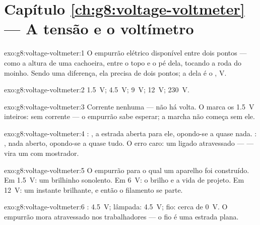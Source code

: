 \section*{Capítulo \ref{ch:g8:voltage-voltmeter} --- A tensão e o voltímetro}

\begin{solution}{exo:g8:voltage-voltmeter:1}
O empurrão elétrico disponível entre dois pontos --- como a altura de
uma cachoeira, entre o topo e o pé dela, tocando a roda do moinho.
Sendo uma diferença, ela precisa de dois pontos; a  dela é o
, \unit{V}.
\end{solution}

\begin{solution}{exo:g8:voltage-voltmeter:2}
\qty{1.5}{V}; \qty{4.5}{V}; \qty{9}{V}; \qty{12}{V}; \qty{230}{V}.
\end{solution}

\begin{solution}{exo:g8:voltage-voltmeter:3}
Corrente nenhuma --- não há volta. O  marca os \qty{1.5}{V}
inteiros:  sem corrente --- o empurrão sabe esperar; a marcha
não começa sem ele.
\end{solution}

\begin{solution}{exo:g8:voltage-voltmeter:4}
: , a estrada aberta para ele, opondo-se a quase
nada. : , nada aberto, opondo-se a quase tudo. O
erro caro: um  ligado atravessado ---  --- vira
um  com mostrador.
\end{solution}

\begin{solution}{exo:g8:voltage-voltmeter:5}
O empurrão para o qual um aparelho foi construído. Em \qty{1.5}{V}:
um brilhinho sonolento. Em \qty{6}{V}: o brilho e a vida de projeto.
Em \qty{12}{V}: um instante brilhante, e então o filamento se parte.
\end{solution}

\begin{solution}{exo:g8:voltage-voltmeter:6}
: \qty{4.5}{V}; lâmpada: \qty{4.5}{V}; fio: cerca de \qty{0}{V}.
O empurrão mora atravessado nos trabalhadores --- o fio é uma estrada
plana.
\end{solution}

